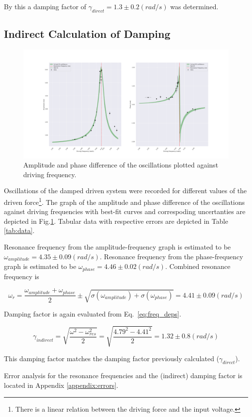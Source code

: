 By this a damping factor of $\gamma_{direct} = 1.3 \pm 0.2 (rad/s)$ was determined.

\subsection{Indirect Calculation of Damping} \label{sec:indirect_damping}

\begin{figure}[H]
  \centering
  \includegraphics[width=1\textwidth]{oscillations/images/resonance}
  \caption{Amplitude and phase difference of the oscillations plotted against driving frequency.}
  \label{fig:resonance}
\end{figure}

Oscillations of the damped driven system were recorded for different values of the driven force\footnote{There is a linear relation between the driving force and the input voltage.}. The graph of the amplitude and phase difference of the oscillations against driving frequencies with best-fit curves and correspoding uncertanties are depicted in Fig.\ref{fig:resonance}. Tabular data with respective errors are depicted in Table \ref{tab:data}.

Resonance frequency from the amplitude-frequency graph is estimated to be $\omega_{amplitude} = 4.35 \pm 0.09 (rad/s)$. Resonance frequency from the phase-frequency graph is estimated to be $\omega_{phase} = 4.46 \pm 0.02 (rad/s)$. Combined resonance frequency is

\begin{equation*}
\omega_{r} = \frac{\omega_{amplitude} + \omega_{phase}}{2} \pm \sqrt{\sigma(\omega_{amplitude}) + \sigma(\omega_{phase})} = 4.41 \pm 0.09 (rad/s)
\end{equation*}

Damping factor is again evaluated from Eq.~\ref{eq:freq_deps}.

\begin{equation*}
        \gamma_{indirect} = \sqrt{ \frac{\omega^2 - \omega_{res}^2}{2} } = \sqrt{ \frac{4.79^2 - 4.41^2}{2} } = 1.32 \pm 0.8 (rad/s)
\end{equation*}       

This damping factor matches the damping factor previously calculated ($\gamma_{direct}$).

Error analysis for the resonance frequencies and the (indirect) damping factor is located in Appendix \ref{appendix:errors}.
